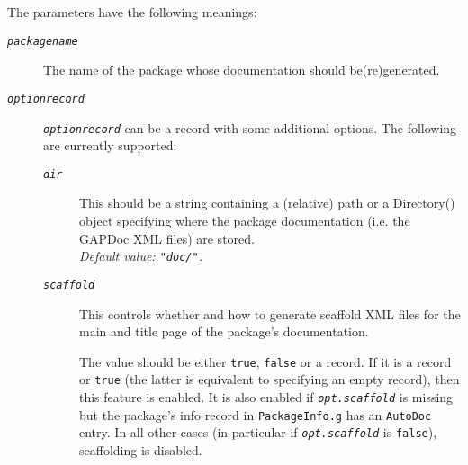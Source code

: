 \documentclass[a4paper,11pt]{report}
\begin{document}
{{{ The parameters have the following meanings: 
\begin{description}
\item[{\mbox{\texttt{\mdseries\slshape package{\textunderscore}name}}}]  The name of the package whose documentation should be(re)generated. 
\item[{\mbox{\texttt{\mdseries\slshape option{\textunderscore}record}}}]  \mbox{\texttt{\mdseries\slshape option{\textunderscore}record}} can be a record with some additional options. The following are currently
supported: 
\begin{description}
\item[{\mbox{\texttt{\mdseries\slshape dir}}}]  This should be a string containing a (relative) path or a Directory() object
specifying where the package documentation (i.e. the \textsf{GAPDoc} XML files) are stored. \\
 \emph{Default value: \texttt{"doc/"}.} 
\item[{\mbox{\texttt{\mdseries\slshape scaffold}}}]  This controls whether and how to generate scaffold XML files for the main and
title page of the package's documentation. 

 The value should be either \texttt{true}, \texttt{false} or a record. If it is a record or \texttt{true} (the latter is equivalent to specifying an empty record), then this feature is
enabled. It is also enabled if \mbox{\texttt{\mdseries\slshape opt.scaffold}} is missing but the package's info record in \texttt{PackageInfo.g} has an \texttt{AutoDoc} entry. In all other cases (in particular if \mbox{\texttt{\mdseries\slshape opt.scaffold}} is \texttt{false}), scaffolding is disabled. 


\end{description}
\end{description}}}}
\end{document}
